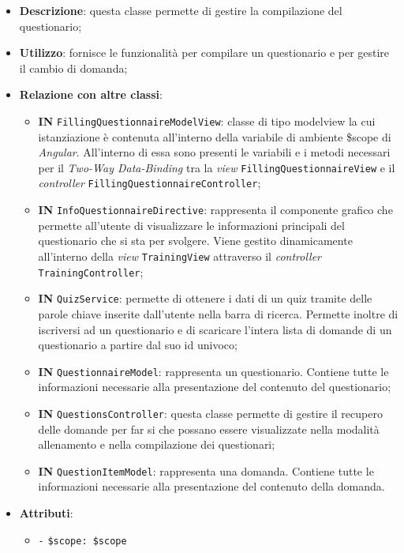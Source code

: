 \begin{itemize}
	\item \textbf{Descrizione}: questa classe permette di gestire la compilazione del questionario;
	\item \textbf{Utilizzo}: fornisce le funzionalità per compilare un questionario e per gestire il cambio di domanda;
	\item \textbf{Relazione con altre classi}:
	\begin{itemize}
		\item \textbf{IN} \texttt{FillingQuestionnaireModelView}: classe di tipo modelview la cui istanziazione è contenuta all'interno della variabile di ambiente \$scope di \textit{Angular}. All'interno di essa sono presenti le variabili e i metodi necessari per il \textit{Two-Way Data-Binding} tra la \textit{view} \texttt{FillingQuestionnaireView} e il \textit{controller} \texttt{FillingQuestionnaireController};  
		\item \textbf{IN} \texttt{InfoQuestionnaireDirective}: rappresenta il componente grafico che permette all'utente di visualizzare le informazioni principali del questionario che si sta per svolgere. Viene gestito dinamicamente all'interno della \textit{view} \texttt{TrainingView} attraverso il \textit{controller} \texttt{TrainingController};
		\item \textbf{IN} \texttt{QuizService}: permette di ottenere i dati di un quiz tramite delle parole chiave inserite dall'utente nella barra di ricerca. Permette inoltre di iscriversi ad un questionario e di scaricare l'intera lista di domande di un questionario a partire dal suo id univoco;
		\item \textbf{IN} \texttt{QuestionnaireModel}: rappresenta un questionario. Contiene tutte le informazioni necessarie alla presentazione del contenuto del questionario;
		\item \textbf{IN} \texttt{QuestionsController}: questa classe permette di gestire il recupero delle domande per far si che possano essere visualizzate nella modalità allenamento e nella compilazione dei questionari; 
		\item \textbf{IN} \texttt{QuestionItemModel}: rappresenta una domanda. Contiene tutte le informazioni necessarie alla presentazione del contenuto della domanda.
	\end{itemize}
	\item \textbf{Attributi}:
	\begin{itemize}
		\item \texttt{-} \texttt{\$scope: \$scope} \\

\end{itemize}
\end{itemize}
